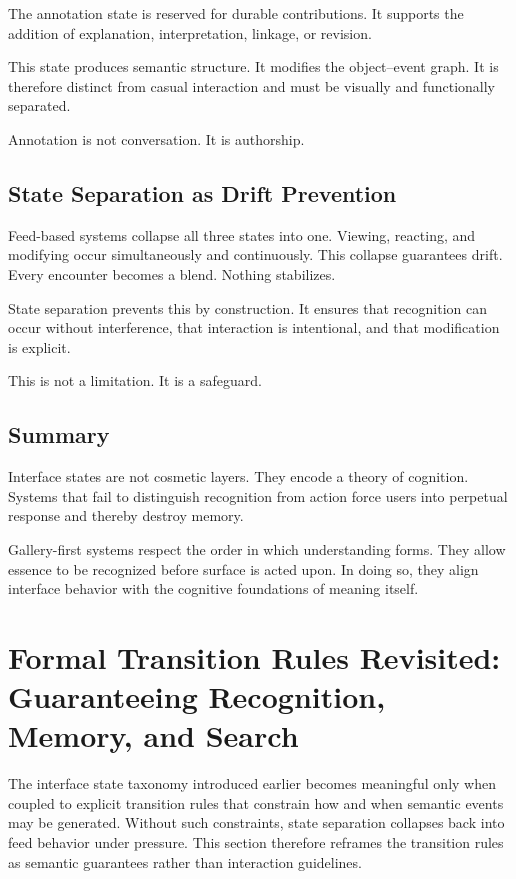 \documentclass[11pt,oneside]{article}
\begin{document}
The annotation state is reserved for durable contributions. It supports the addition of explanation, interpretation, linkage, or revision.

This state produces semantic structure. It modifies the object–event graph. It is therefore distinct from casual interaction and must be visually and functionally separated.

Annotation is not conversation. It is authorship.

\subsection{State Separation as Drift Prevention}

Feed-based systems collapse all three states into one. Viewing, reacting, and modifying occur simultaneously and continuously. This collapse guarantees drift. Every encounter becomes a blend. Nothing stabilizes.

State separation prevents this by construction. It ensures that recognition can occur without interference, that interaction is intentional, and that modification is explicit.

This is not a limitation. It is a safeguard.

\subsection{Summary}

Interface states are not cosmetic layers. They encode a theory of cognition. Systems that fail to distinguish recognition from action force users into perpetual response and thereby destroy memory.

Gallery-first systems respect the order in which understanding forms. They allow essence to be recognized before surface is acted upon. In doing so, they align interface behavior with the cognitive foundations of meaning itself.

\section{Formal Transition Rules Revisited: Guaranteeing Recognition, Memory, and Search}

The interface state taxonomy introduced earlier becomes meaningful only when coupled to explicit transition rules that constrain how and when semantic events may be generated. Without such constraints, state separation collapses back into feed behavior under pressure. This section therefore reframes the transition rules as semantic guarantees rather than interaction guidelines.
\end{document}
